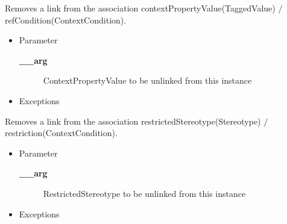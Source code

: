 \begin{desc}Removes a link from the association contextPropertyValue(TaggedValue)
 $/$ refCondition(ContextCondition).
\begin{itemize}
\item{Parameter
  \begin{description}
   \item[{\bf \_\_arg}]{ContextPropertyValue to be unlinked from this instance}
  \end{description}}
\end{itemize}
\begin{itemize}
\item{{Exceptions}
}
\end{itemize}
\end{desc}

\begin{desc}Removes a link from the association restrictedStereotype(Stereotype)
 $/$ restriction(ContextCondition).
\begin{itemize}
\item{Parameter
  \begin{description}
   \item[{\bf \_\_arg}]{RestrictedStereotype to be unlinked from this instance}
  \end{description}}
\end{itemize}
\begin{itemize}
\item{{Exceptions}
}
\end{itemize}
\end{desc}

